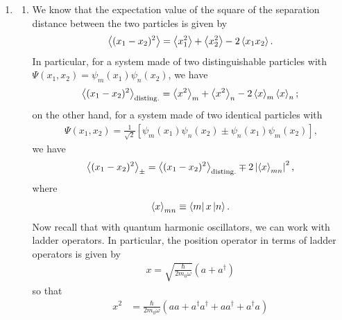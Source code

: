 \documentclass[11pt]{article}
\begin{document}

\pagestyle{fancy}
\fancyhf{}
\cfoot{\thepage}

\begin{enumerate}[label=\textbf{\arabic*}.]
    \item %
    \begin{enumerate}
        \item %
            We know that the expectation value of the square of the separation distance between the two particles is given by
            \begin{align*}
                \expval{(x_1 - x_2)^2} = \expval{x_1^2} + \expval{x_2^2} - 2\expval{x_1 x_2} \text{.} 
            \end{align*}
            In particular, for a system made of two distinguishable particles with $\Psi(x_1,x_2) = \psi_m(x_1)\psi_n(x_2)$, we have
            \begin{align*}
                \expval{(x_1 - x_2)^2}_\mathrm{disting.} = \expval{x^2}_m + \expval{x^2}_n - 2\expval{x}_m \expval{x}_n \text{;}
            \end{align*}
            on the other hand, for a system made of two identical particles with
            \begin{align*}
                \Psi(x_1,x_2) = \frac{1}{\sqrt{2}}\left[\psi_m(x_1)\psi_n(x_2) \pm \psi_n(x_1) \psi_m(x_2) \right] \text{,}
            \end{align*}
            we have
            \begin{align*}
                \expval{(x_1 - x_2)^2}_{\pm} =\expval{(x_1 - x_2)^2}_\mathrm{disting.} \mp 2\left| \expval{x}_{mn} \right|^2 \text{,}
            \end{align*}
            where
            \begin{align*}
                \expval{x}_{mn} \equiv \bra{m}x\ket{n} \text{.}
            \end{align*}
            Now recall that with quantum harmonic oscillators, we can work with ladder operators. In particular, the position operator in terms of ladder operators is given by
            \begin{align*}
                x = \sqrt{\frac{\hbar}{2m_0 \omega}} \left(a + a^\dagger\right)
            \end{align*}
            so that
            \begin{align*}
                x^2 &= \frac{\hbar}{2m_0 \omega} \left(aa + a^\dagger a^\dagger + aa^\dagger + a^\dagger a\right) \\

\end{align*}
\end{enumerate}
\end{enumerate}
\end{document}
